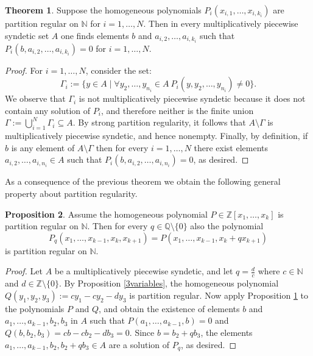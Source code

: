 \documentclass[a4paper,oneside]{article}
\newcommand{\N}{\mathbb{N}}
\newcommand{\Q}{\mathbb{Q}}
\newcommand{\Z}{\mathbb{Z}}
\theoremstyle{definition}
\newtheorem{theorem}{Theorem}[section]
\newtheorem{proposition}[theorem]{Proposition}
\theoremstyle{named}
\begin{document}
\begin{theorem}\label{jointPR}
Suppose the homogeneous polynomials $P_i\left(x_{i,1},\ldots,x_{i,k_i}\right)$ 
are partition regular on $\N$ for $i=1,\ldots, N$. Then in every multiplicatively piecewise syndetic set $A$
one finds elements $b$ and $a_{i,2},\ldots,a_{i,k_i}$
such that $P_i\left(b,a_{i,2},\ldots,a_{i,k_i}\right)=0$ for $i=1,\ldots,N$.
\end{theorem}

\begin{proof}
For $i=1,\ldots,N$, consider the set:
$$\Gamma_i:=\{y\in A\mid \forall y_2,\ldots,y_{n_i}\in A\  P_i(y,y_2,\ldots,y_{n_i})\ne 0\}.$$
We observe that $\Gamma_i$ is not multiplicatively piecewise syndetic because it does not contain
any solution of $P_i$, and therefore neither is the finite union 
$\Gamma:=\bigcup_{i=1}^N\Gamma_i\subseteq A$.
By strong partition regularity, it follows that
$A\setminus\Gamma$ is multiplicatively piecewise syndetic, and hence nonempty. Finally, by definition,
if $b$ is any element of $A\setminus\Gamma$ then
for every $i=1,\ldots,N$ there exist elements $a_{i,2},\ldots,a_{i,n_i}\in A$ 
such that $P_i(b,a_{i,2},\ldots,a_{i,n_i})=0$, as desired. 
\end{proof}

As a consequence of the previous theorem we obtain the following general property
about partition regularity.

\begin{proposition}\label{inductive-lemma}
Assume the homogeneous polynomial $P\in\Z[x_1,\ldots,x_k]$ is partition regular on $\N$.
Then for every $q\in\Q\setminus\{0\}$ also the polynomial
$$P_q(x_1,\ldots,x_{k-1},x_k,x_{k+1})=P(x_1,\ldots,x_{k-1},x_k+qx_{k+1})$$
is partition regular on $\N$.
\end{proposition}

\begin{proof}
Let $A$ be a multiplicatively piecewise syndetic, and let $q=\frac{d}{c}$ 
where $c\in\N$ and $d\in\Z\setminus\{0\}$.
By Proposition \ref{3variables}, the 
homogeneous polynomial $Q(y_1,y_2,y_3):=cy_1-cy_2-dy_3$ is partition regular. 
Now apply Proposition \ref{jointPR} to the polynomials $P$ and $Q$, 
and obtain the existence of elements $b$ and $a_1,\ldots,a_{k-1},b_2,b_3$ in $A$ such that
$P(a_1,\ldots,a_{k-1},b)=0$ and $Q(b,b_2,b_3)=c b-c b_2-db_3=0$.
Since $b=b_2+q b_3$, the elements
$a_1,\ldots,a_{k-1},b_2,b_2+q b_3\in A$ are a solution of 
$P_q$, as desired. 
\end{proof}
\end{document}
